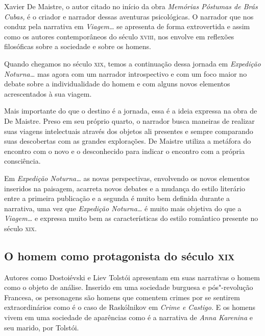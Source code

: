 \documentclass[12pt]{extarticle}
\begin{document}
Xavier De Maistre, o autor citado no início da obra \emph{Memórias
Póstumas de Brás Cubas,} é o criador e narrador dessas aventuras
psicológicas. O narrador que nos conduz pela narrativa em
\emph{Viagem\ldots} se apresenta de forma extrovertida e assim como os
autores contemporâneos do século \textsc{xviii}, nos envolve em reflexões
filosóficas sobre a sociedade e sobre os homens.




Quando chegamos no século \textsc{xix}, temos a continuação dessa jornada em
\emph{Expedição Noturna\ldots} mas agora com um narrador introspectivo e
com um foco maior no debate sobre a individualidade do homem e com
alguns novos elementos acrescentados à sua viagem.

Mais importante do que o destino é a jornada, essa é a ideia expressa na
obra de De Maistre. Preso em seu próprio quarto, o narrador busca
maneiras de realizar suas viagens intelectuais através dos objetos ali
presentes e sempre comparando suas descobertas com as grandes
explorações. De Maistre utiliza a metáfora do encontro com o novo e o
desconhecido para indicar o encontro com a própria consciência.




Em \emph{Expedição Noturna\ldots} as novas perspectivas, envolvendo os
novos elementos inseridos na paisagem, acarreta novos debates e a
mudança do estilo literário entre a primeira publicação e a segunda é
muito bem definida durante a narrativa, uma vez que \emph{Expedição
Noturna\ldots} é muito mais objetiva do que a \emph{Viagem\ldots} e expressa
muito bem as características do estilo romântico presente no século \textsc{xix}.

\subsection{O homem como protagonista do século \textsc{xix}}

Autores como Dostoiévski e Liev Tolstói apresentam em suas narrativas o
homem como o objeto de análise. Inserido em uma sociedade burguesa e
pós"-revolução Francesa, os personagens são homens que comentem crimes
por se sentirem extraordinários como é o caso de Raskólnikov em
\emph{Crime e Castigo.} E os homens vivem em uma sociedade de aparências
como é a narrativa de \emph{Anna Karenina} e seu marido, por Tolstói.
\end{document}
